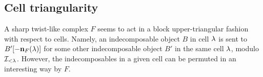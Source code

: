 %
%

\subsection{Cell triangularity}
\label{subsec:celltri}

A sharp twist-like complex $F$ seems to act in a block upper-triangular fashion with respect to cells. Namely, an indecomposable object $B$ in cell $\lambda$ is sent to $B'[-{\mathbf n}_F(\lambda)]$ for
some other indecomposable object $B'$ in the same cell $\lambda$, modulo ${\mathcal{I}}_{< \lambda}$. However, the indecomposables in a given cell can be permuted in an interesting way by $F$. 

